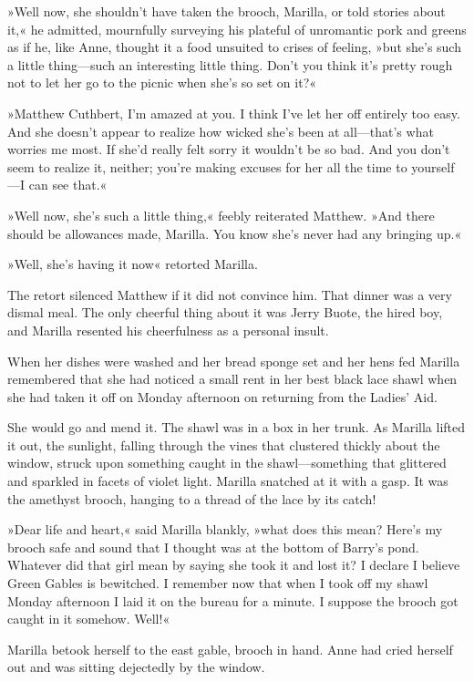 »Well now, she shouldn’t have taken the brooch, Marilla, or told stories about it,« he admitted, mournfully surveying his plateful of unromantic pork and greens as if he, like Anne, thought it a food unsuited to crises of feeling, »but she’s such a little thing—such an interesting little thing. Don’t you think it’s pretty rough not to let her go to the picnic when she’s so set on it?«

»Matthew Cuthbert, I’m amazed at you. I think I’ve let her off entirely too easy. And she doesn’t appear to realize how wicked she’s been at all—that’s what worries me most. If she’d really felt sorry it wouldn’t be so bad. And you don’t seem to realize it, neither; you’re making excuses for her all the time to yourself—I can see that.«

»Well now, she’s such a little thing,« feebly reiterated Matthew. »And there should be allowances made, Marilla. You know she’s never had any bringing up.«

»Well, she’s having it now« retorted Marilla.

The retort silenced Matthew if it did not convince him. That dinner was a very dismal meal. The only cheerful thing about it was Jerry Buote, the hired boy, and Marilla resented his cheerfulness as a personal insult.

When her dishes were washed and her bread sponge set and her hens fed Marilla remembered that she had noticed a small rent in her best black lace shawl when she had taken it off on Monday afternoon on returning from the Ladies’ Aid.

She would go and mend it. The shawl was in a box in her trunk. As Marilla lifted it out, the sunlight, falling through the vines that clustered thickly about the window, struck upon something caught in the shawl—something that glittered and sparkled in facets of violet light. Marilla snatched at it with a gasp. It was the amethyst brooch, hanging to a thread of the lace by its catch!

»Dear life and heart,« said Marilla blankly, »what does this mean? Here’s my brooch safe and sound that I thought was at the bottom of Barry’s pond. Whatever did that girl mean by saying she took it and lost it? I declare I believe Green Gables is bewitched. I remember now that when I took off my shawl Monday afternoon I laid it on the bureau for a minute. I suppose the brooch got caught in it somehow. Well!«

Marilla betook herself to the east gable, brooch in hand. Anne had cried herself out and was sitting dejectedly by the window.

